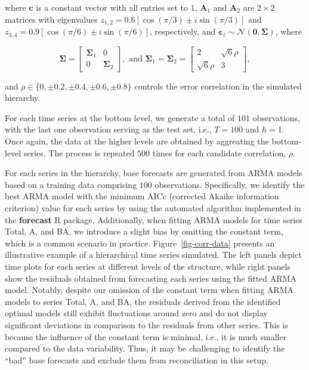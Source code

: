 \documentclass[11pt,a4paper,]{article}
\begin{document}
where \(\boldsymbol{c}\) is a constant vector with all entries set to
\(1\), \(\boldsymbol{A}_1\) and \(\boldsymbol{A}_2\) are \(2 \times 2\)
matrices with eigenvalues
\(z_{1,2}=0.6[\cos (\pi / 3) \pm i \sin (\pi / 3)]\) and
\(z_{3,4}=0.9[\cos (\pi / 6) \pm i \sin (\pi / 6)]\), respectively, and
\(\boldsymbol{\varepsilon}_t \sim \mathcal{N}(\boldsymbol{0}, \boldsymbol{\Sigma})\),
where

\[
\boldsymbol{\Sigma}=\left[\begin{array}{cc}
\boldsymbol{\Sigma}_1 & 0 \\0 & \boldsymbol{\Sigma}_2
\end{array}\right], \text { and } \boldsymbol{\Sigma}_1=\boldsymbol{\Sigma}_2=\left[\begin{array}{cc}2 & \sqrt{6} \rho \\\sqrt{6} \rho & 3\end{array}\right],
\]

and \(\rho \in \{0, \pm 0.2, \pm 0.4, \pm 0.6, \pm 0.8\}\) controls the
error correlation in the simulated hierarchy.

For each time series at the bottom level, we generate a total of \(101\)
observations, with the last one observation serving as the test set,
i.e., \(T=100\) and \(h=1\). Once again, the data at the higher levels
are obtained by aggreating the bottom-level series. The process is
repeated \(500\) times for each candidate correlation, \(\rho\).

For each series in the hierarchy, base forecasts are generated from ARMA
models based on a training data comprising \(100\) observations.
Specifically, we identify the best ARMA model with the minimum AICc
(corrected Akaike information criterion) value for each series by using
the automated algorithm implemented in the \textbf{forecast} R package.
Additionally, when fitting ARMA models for time series Total, A, and BA,
we introduce a slight bias by omitting the constant term, which is a
common scenario in practice. Figure~\ref{fig-corr-data} presents an
illustrative example of a hierarchical time series simulated. The left
panels depict time plots for each series at different levels of the
structure, while right panels show the residuals obtained from
forecasting each series using the fitted ARMA model. Notably, despite
our omission of the constant term when fitting ARMA models to series
Total, A, and BA, the residuals derived from the identified optimal
models still exhibit fluctuations around zero and do not display
significant deviations in comparison to the residuals from other series.
This is because the influence of the constant term is minimal, i.e., it
is much smaller compared to the data variability. Thus, it may be
challenging to identify the ``bad'' base forecasts and exclude them from
reconciliation in this setup.
\end{document}
